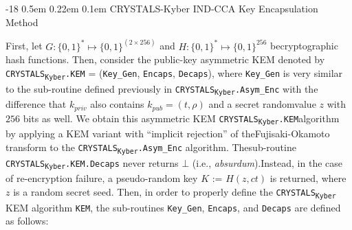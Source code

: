 \documentclass[runningheads]{llncs}
\makeatletter
\renewcommand\subsubsection{\@startsection{subsubsection}{3}{\z@}%
                       {-18\p@ \@plus -4\p@ \@minus -4\p@}%
                       {0.5em \@plus 0.22em \@minus 0.1em}%
                       {\normalfont\normalsize\bfseries\boldmath}}
\numberwithin{equation}{section}
\makeatother
\begin{document}
    \newpage


    \subsubsection{CRYSTALS-Kyber IND-CCA Key Encapsulation Method}
    \label{subsubsec:crystals-kyber-ind-cca-key-encapsulation-method}

    First, let $G: { \{ 0, 1 \} }^{*} \mapsto { \{ 0, 1 \} }^{ ( 2 \times 256 ) }$ and $H: { \{ 0, 1 \} }^{*} \mapsto { \{ 0, 1 \} }^{ 256 }$ be\break cryptographic hash functions. Then, consider the public-key asymmetric KEM denoted by \texorpdfstring{\texttt{CRYSTALS}\textsubscript{\texttt{Kyber}}\texttt{.KEM} = \big(\texttt{Key\_Gen}, \texttt{Encaps}, \texttt{Decaps}\big)}\/, where \texttt{Key\_Gen} is very similar to the sub-routine defined previously in \texorpdfstring{\texttt{CRYSTALS}\textsubscript{\texttt{Kyber}}\texttt{.Asym\_Enc}}, with the difference that ${k}_{priv}$ also contains ${k}_{pub} = (t, \rho)$ and a secret random\break value $z$ with $256$ bits as well. We obtain this asymmetric KEM \texorpdfstring{\texttt{CRYSTALS}\textsubscript{\texttt{Kyber}}\texttt{.KEM}}\/\break algorithm by applying a KEM variant with ``implicit rejection'' of the\break Fujisaki-Okamoto transform to the \texorpdfstring{\texttt{CRYSTALS}\textsubscript{\texttt{Kyber}}\texttt{.Asym\_Enc}}\/ algorithm. The\break sub-routine \texorpdfstring{\texttt{CRYSTALS}\textsubscript{\texttt{Kyber}}\texttt{.KEM}\texttt{.Decaps}}\/ never returns $\bot$ (i.e., \textit{absurdum}).\break Instead, in the case of re-encryption failure, a pseudo-random key $K$ := $H(z, ct)$ is returned, where $z$ is a random secret seed. Then, in order to properly define the \texorpdfstring{\texttt{CRYSTALS}\textsubscript{\texttt{Kyber}}}\/ KEM algorithm \texttt{KEM}, the sub-routines \texttt{Key\_Gen}, \texttt{Encaps}, and \texttt{Decaps} are defined as follows:
\end{document}
